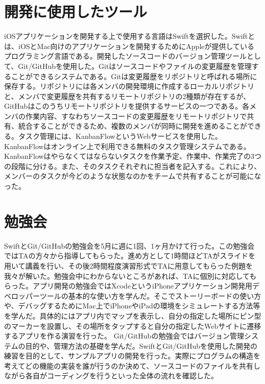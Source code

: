 \section{開発に使用したツール}

iOSアプリケーションを開発する上で使用する言語はSwiftを選択した。Swiftとは、iOSとMac向けのアプリケーションを開発するためにAppleが提供しているプログラミング言語である。開発したソースコードのバージョン管理ツールとして、Git/GitHubを使用した。Gitはソースコードやファイルの変更履歴を管理することができるシステムである。Gitは変更履歴をリポジトリと呼ばれる場所に保存する。リポジトリには各メンバの開発環境に作成するローカルリポジトリと、メンバで変更履歴を共有するリモートリポジトリの2種類が存在するが、GitHubはこのうちリモートリポジトリを提供するサービスの一つである。各メンバの作業内容、すなわちソースコードの変更履歴をリモートリポジトリで共有、統合することができるため、複数のメンバが同時に開発を進めることができる。タスク管理には、KanbanFlowというWebサービスを使用した。KanbanFlowはオンライン上で利用できる無料のタスク管理システムである。KanbanFlowはやらなくてはならないタスクを作業予定、作業中、作業完了の3つの段階に分ける。また、そのタスクそれぞれに担当者を記入する。これにより、メンバーのタスクが今どのような状態なのかをチームで共有することが可能になった。

\section{勉強会}
SwiftとGit/GitHubの勉強会を5月に週に1回、1ヶ月かけて行った。この勉強会ではTAの方々から指導してもらった。進め方として1時間ほどTAがスライドを用いて講義を行い、その後2時間程度演習形式でTAに用意してもらった例題を我々が解いた。勉強会中にわからないところがあれば、TAに個別に対応してもらった。アプリ開発の勉強会ではXcodeというiPhoneアプリケーション開発用デベロッパーツールの基本的な使い方を学んだ。そこでストーリーボードの使い方や、デバッグするためにMac上でiPhoneやiPadの環境をシミュレートする方法等を学んだ。具体的にはアプリ内でマップを表示し、自分の指定した場所にピン型のマーカーを設置し、その場所をタップすると自分の指定したWebサイトに遷移するアプリを作る演習を行った。
Git/GitHubの勉強会ではバージョン管理システムの目的や、管理方法の基礎を学んだ。SwiftとGit/GitHubを使用した開発の練習を目的として、サンプルアプリの開発を行った。実際にプログラムの構造を考えてどの機能の実装を誰が行うのか決めて、ソースコードのファイルを共有しながら各自がコーディングを行うといった全体の流れを確認した。


